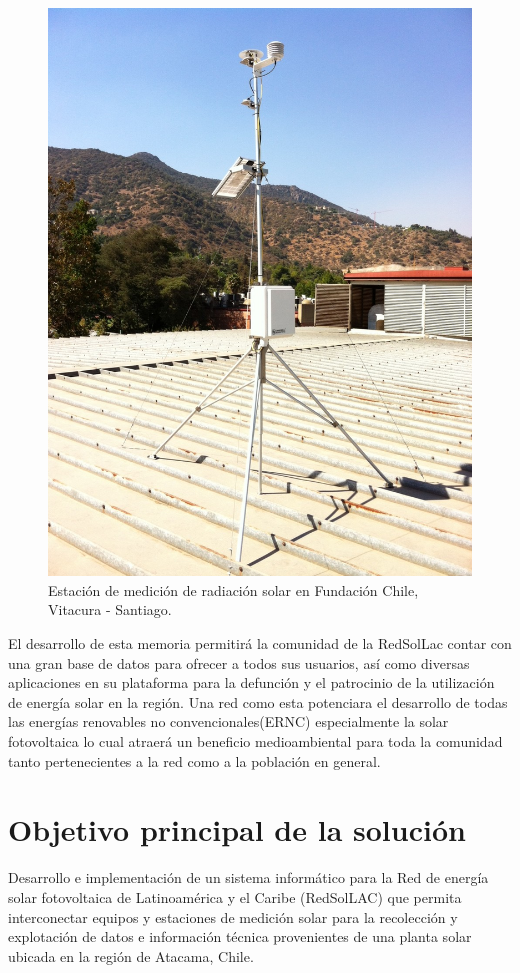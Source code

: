 \begin{figure}[h!]
        \centering
        \includegraphics[scale=0.12]{images/estacionMedicionFch}
        \caption{\tiny Estación de medición de radiación solar en Fundación Chile, Vitacura - Santiago.}
\end{figure}

El desarrollo de esta memoria permitirá la comunidad de la RedSolLac contar con una gran base de datos para ofrecer a todos sus usuarios, así como diversas aplicaciones en su plataforma para la defunción y el patrocinio de la utilización de energía solar en la región. Una red como esta potenciara el desarrollo de todas las energías renovables no convencionales(ERNC) especialmente la solar fotovoltaica lo cual atraerá un beneficio medioambiental para toda la comunidad tanto pertenecientes a la red como a la población en general.

\section{Objetivo principal de la solución}
Desarrollo e implementación de un sistema informático para la Red de energía solar fotovoltaica de Latinoamérica y el Caribe (RedSolLAC) que permita interconectar equipos y estaciones de medición solar para la recolección y explotación de datos e información técnica provenientes de una planta solar ubicada en la región de Atacama, Chile.

